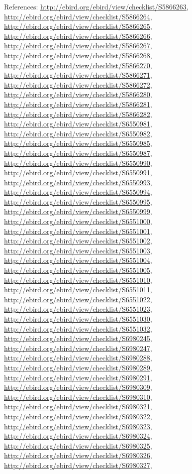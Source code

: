\documentclass[9pt, article]{memoir}
\begin{document}
\begin{multicols}{2}
References: 
\url{http://ebird.org/ebird/view/checklist/S5866263}, 
\url{http://ebird.org/ebird/view/checklist/S5866264}, 
\url{http://ebird.org/ebird/view/checklist/S5866265}, 
\url{http://ebird.org/ebird/view/checklist/S5866266}, 
\url{http://ebird.org/ebird/view/checklist/S5866267}, 
\url{http://ebird.org/ebird/view/checklist/S5866268}, 
\url{http://ebird.org/ebird/view/checklist/S5866270}, 
\url{http://ebird.org/ebird/view/checklist/S5866271}, 
\url{http://ebird.org/ebird/view/checklist/S5866272}, 
\url{http://ebird.org/ebird/view/checklist/S5866280}, 
\url{http://ebird.org/ebird/view/checklist/S5866281}, 
\url{http://ebird.org/ebird/view/checklist/S5866282}, 
\url{http://ebird.org/ebird/view/checklist/S6550981}, 
\url{http://ebird.org/ebird/view/checklist/S6550982}, 
\url{http://ebird.org/ebird/view/checklist/S6550985}, 
\url{http://ebird.org/ebird/view/checklist/S6550987}, 
\url{http://ebird.org/ebird/view/checklist/S6550990}, 
\url{http://ebird.org/ebird/view/checklist/S6550991}, 
\url{http://ebird.org/ebird/view/checklist/S6550993}, 
\url{http://ebird.org/ebird/view/checklist/S6550994}, 
\url{http://ebird.org/ebird/view/checklist/S6550995}, 
\url{http://ebird.org/ebird/view/checklist/S6550999}, 
\url{http://ebird.org/ebird/view/checklist/S6551000}, 
\url{http://ebird.org/ebird/view/checklist/S6551001}, 
\url{http://ebird.org/ebird/view/checklist/S6551002}, 
\url{http://ebird.org/ebird/view/checklist/S6551003}, 
\url{http://ebird.org/ebird/view/checklist/S6551004}, 
\url{http://ebird.org/ebird/view/checklist/S6551005}, 
\url{http://ebird.org/ebird/view/checklist/S6551010}, 
\url{http://ebird.org/ebird/view/checklist/S6551011}, 
\url{http://ebird.org/ebird/view/checklist/S6551022}, 
\url{http://ebird.org/ebird/view/checklist/S6551023}, 
\url{http://ebird.org/ebird/view/checklist/S6551030}, 
\url{http://ebird.org/ebird/view/checklist/S6551032}, 
\url{http://ebird.org/ebird/view/checklist/S6980245}, 
\url{http://ebird.org/ebird/view/checklist/S6980247}, 
\url{http://ebird.org/ebird/view/checklist/S6980288}, 
\url{http://ebird.org/ebird/view/checklist/S6980289}, 
\url{http://ebird.org/ebird/view/checklist/S6980291}, 
\url{http://ebird.org/ebird/view/checklist/S6980309}, 
\url{http://ebird.org/ebird/view/checklist/S6980310}, 
\url{http://ebird.org/ebird/view/checklist/S6980321}, 
\url{http://ebird.org/ebird/view/checklist/S6980322}, 
\url{http://ebird.org/ebird/view/checklist/S6980323}, 
\url{http://ebird.org/ebird/view/checklist/S6980324}, 
\url{http://ebird.org/ebird/view/checklist/S6980325}, 
\url{http://ebird.org/ebird/view/checklist/S6980326}, 
\url{http://ebird.org/ebird/view/checklist/S6980327}, 

\end{multicols}
\end{document}
